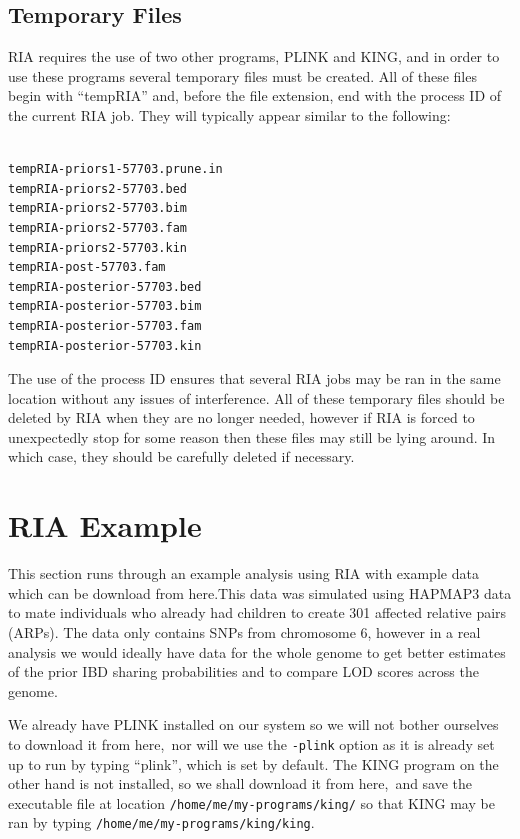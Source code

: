 \documentclass[a4paper,12pt]{article}
\newcommand{\code}[1]{{\footnotesize{{\tt #1}}}}
\begin{document}
\subsection{Temporary Files}
\label{temporary}

RIA requires the use of two other programs, PLINK and KING, and in order to use these programs several temporary files must be created. All of these files begin with ``tempRIA'' and, before the file extension, end with the process ID of the current RIA job. They will typically appear similar to the following: 
\vspace{0.35cm} \begin{lstlisting}

tempRIA-priors1-57703.prune.in
tempRIA-priors2-57703.bed
tempRIA-priors2-57703.bim
tempRIA-priors2-57703.fam
tempRIA-priors2-57703.kin
tempRIA-post-57703.fam
tempRIA-posterior-57703.bed
tempRIA-posterior-57703.bim
tempRIA-posterior-57703.fam
tempRIA-posterior-57703.kin

\end{lstlisting} \vspace{0.35cm}
The use of the process ID ensures that several RIA jobs may be ran in the same location without any issues of interference. All of these temporary files should be deleted by RIA when they are no longer needed, however if RIA is forced to unexpectedly stop for some reason then these files may still be lying around. In which case, they should be carefully deleted if necessary. 




\section{RIA Example}
\label{example}

This section runs through an example analysis using RIA with example data which can be download from here.This data was simulated using HAPMAP3 data to mate individuals who already had children to create 301 affected relative pairs (ARPs). The data only contains SNPs from chromosome 6, however in a real analysis we would ideally have data for the whole genome to get better estimates of the prior IBD sharing probabilities and to compare LOD scores across the genome. 

We already have PLINK installed on our system so we will not bother ourselves to download it from here,~nor will we use the \code{-plink} option as it is already set up to run by typing ``plink'', which is set by default. The KING program on the other hand is not installed, so we shall download it from here,~and save the executable file at location \code{/home/me/my-programs/king/} so that KING may be ran by typing \code{/home/me/my-programs/king/king}. 
\end{document}
